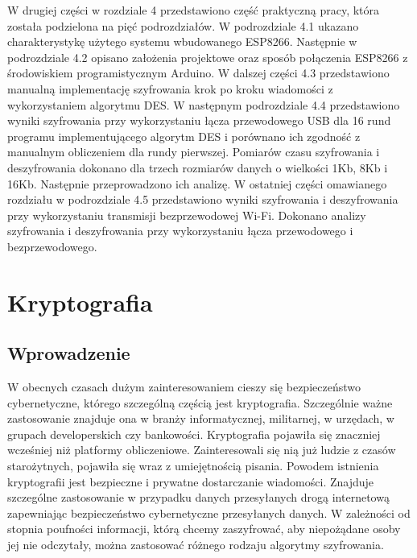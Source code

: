 \documentclass[12p]{article}
\begin{document}
W drugiej części w rozdziale 4 przedstawiono część praktyczną pracy, która została podzielona na pięć podrozdziałów. W podrozdziale 4.1 ukazano charakterystykę użytego systemu wbudowanego ESP8266. Następnie w podrozdziale 4.2 opisano założenia projektowe oraz sposób połączenia ESP8266 z środowiskiem programistycznym Arduino. W dalszej części 4.3 przedstawiono manualną implementację szyfrowania krok po kroku wiadomości z wykorzystaniem algorytmu DES. W następnym podrozdziale 4.4 przedstawiono wyniki szyfrowania przy wykorzystaniu łącza przewodowego USB dla 16 rund programu implementującego algorytm DES i porównano ich zgodność z manualnym obliczeniem dla rundy pierwszej. Pomiarów czasu szyfrowania i deszyfrowania dokonano dla trzech rozmiarów danych o wielkości 1Kb, 8Kb i 16Kb. Następnie przeprowadzono ich analizę. W ostatniej części omawianego rozdziału w podrozdziale 4.5 przedstawiono wyniki szyfrowania i deszyfrowania przy wykorzystaniu transmisji bezprzewodowej Wi-Fi. Dokonano analizy szyfrowania i deszyfrowania przy wykorzystaniu łącza przewodowego i bezprzewodowego.
 
 
 


\newpage

\section{Kryptografia}
\subsection{Wprowadzenie}

\quad W obecnych czasach dużym zainteresowaniem cieszy się bezpieczeństwo cybernetyczne, którego szczególną częścią jest kryptografia. Szczególnie ważne zastosowanie znajduje ona w branży informatycznej, militarnej, w urzędach, w grupach developerskich czy bankowości. Kryptografia pojawiła się znaczniej wcześniej niż platformy obliczeniowe. Zainteresowali się nią już ludzie z czasów starożytnych, pojawiła się wraz z umiejętnością pisania. Powodem istnienia kryptografii jest bezpieczne i prywatne dostarczanie wiadomości. Znajduje szczególne zastosowanie w przypadku danych przesyłanych drogą internetową  zapewniając bezpieczeństwo cybernetyczne przesyłanych danych. W zależności od stopnia poufności informacji, którą chcemy zaszyfrować, aby niepożądane osoby jej nie odczytały, można zastosować różnego rodzaju algorytmy szyfrowania. 
\end{document}
